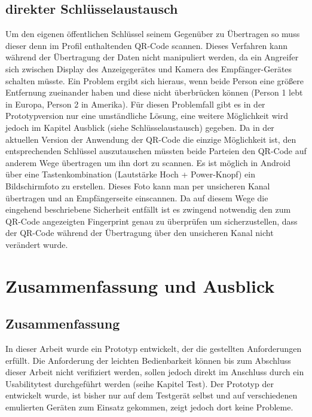 \documentclass[10pt, a4paper,headsepline]{scrreprt}
\begin{document}
\section{direkter Schlüsselaustausch}
Um den eigenen öffentlichen Schlüssel seinem Gegenüber zu Übertragen so muss dieser denn im Profil enthaltenden QR-Code scannen. Dieses Verfahren kann während der Übertragung der Daten nicht manipuliert werden, da ein Angreifer sich zwischen Display des Anzeigegerätes und Kamera des Empfänger-Gerätes schalten müsste. Ein Problem ergibt sich hieraus, wenn beide Person eine größere Entfernung zueinander haben und diese nicht überbrücken können (Person 1 lebt in Europa, Person 2 in Amerika). Für diesen Problemfall gibt es in der Prototypversion nur eine umständliche Lösung, eine weitere Möglichkeit wird jedoch im Kapitel Ausblick (siehe Schlüsselaustausch) gegeben. Da in der aktuellen Version der Anwendung der QR-Code die einzige Möglichkeit ist, den entsprechenden Schlüssel auszutauschen müssten beide Parteien den QR-Code auf anderem Wege übertragen um ihn dort zu scannen. Es ist möglich in Android über eine Tastenkombination (Lautstärke Hoch + Power-Knopf) ein Bildschirmfoto zu erstellen. Dieses Foto kann man per unsicheren Kanal übertragen und an Empfängerseite einscannen. Da auf diesem Wege die eingehend beschriebene Sicherheit entfällt ist es zwingend notwendig den zum QR-Code angezeigten Fingerprint genau zu überprüfen um sicherzustellen, dass der QR-Code während der Übertragung über den unsicheren Kanal nicht verändert wurde.

% 

\chapter{Zusammenfassung und Ausblick}
\section{Zusammenfassung}
In dieser Arbeit wurde ein Prototyp entwickelt, der die gestellten Anforderungen erfüllt. Die Anforderung der leichten Bedienbarkeit können bis zum Abschluss dieser Arbeit nicht verifiziert werden, sollen jedoch direkt im Anschluss durch ein Usabilitytest durchgeführt werden (seihe Kapitel Test). Der Prototyp der entwickelt wurde, ist bisher nur auf dem Testgerät selbst und auf verschiedenen emulierten Geräten zum Einsatz gekommen, zeigt jedoch dort keine Probleme. 
\end{document}
